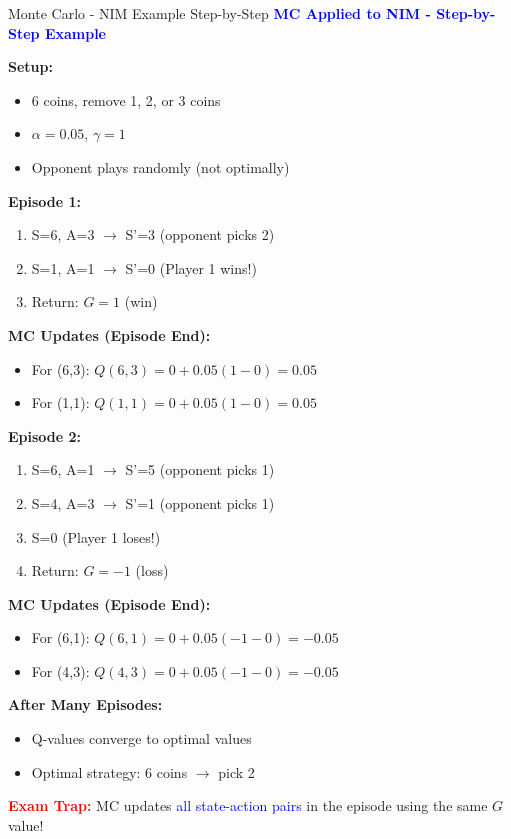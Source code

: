 \documentclass[8pt]{beamer}
\begin{document}
	\begin{frame}{Monte Carlo - NIM Example Step-by-Step}
		\fontsize{6.5}{7.5}\selectfont
		\textcolor{blue}{\textbf{MC Applied to NIM - Step-by-Step Example}}
		
		\textbf{Setup:}
		\begin{itemize}
			\item 6 coins, remove 1, 2, or 3 coins
			\item $\alpha = 0.05$, $\gamma = 1$
			\item Opponent plays randomly (not optimally)
		\end{itemize}
		
		\textbf{Episode 1:}
		\begin{enumerate}
			\item S=6, A=3 $\rightarrow$ S'=3 (opponent picks 2)
			\item S=1, A=1 $\rightarrow$ S'=0 (Player 1 wins!)
			\item Return: $G = 1$ (win)
		\end{enumerate}
		
		\textbf{MC Updates (Episode End):}
		\begin{itemize}
			\item For (6,3): $Q(6,3) = 0 + 0.05(1 - 0) = 0.05$
			\item For (1,1): $Q(1,1) = 0 + 0.05(1 - 0) = 0.05$
		\end{itemize}
		
		\textbf{Episode 2:}
		\begin{enumerate}
			\item S=6, A=1 $\rightarrow$ S'=5 (opponent picks 1)
			\item S=4, A=3 $\rightarrow$ S'=1 (opponent picks 1)
			\item S=0 (Player 1 loses!)
			\item Return: $G = -1$ (loss)
		\end{enumerate}
		
		\textbf{MC Updates (Episode End):}
		\begin{itemize}
			\item For (6,1): $Q(6,1) = 0 + 0.05(-1 - 0) = -0.05$
			\item For (4,3): $Q(4,3) = 0 + 0.05(-1 - 0) = -0.05$
		\end{itemize}
		
		\textbf{After Many Episodes:}
		\begin{itemize}
			\item Q-values converge to optimal values
			\item Optimal strategy: 6 coins $\rightarrow$ pick 2
		\end{itemize}
		
		\textcolor{red}{\textbf{Exam Trap:}} MC updates \textcolor{blue}{all state-action pairs} in the episode using the same $G$ value!
	\end{frame}
	
\end{document}
